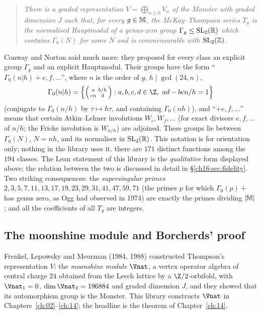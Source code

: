 \begin{quote}\itshape
There is a graded representation $V=\bigoplus_{n\ge0}V_n$ of the Monster with graded dimension $J$ such that, for
every $g\in\mathbb{M}$, the McKay--Thompson series $T_g$ is the normalised Hauptmodul of a genus-zero group
$\Gamma_g\le\mathrm{SL}_2(\mathbb{R})$ which contains $\Gamma_0(N)$ for some $N$ and is commensurable with $\mathrm{SL}_2(\mathbb{Z})$.
\end{quote}
Conway and Norton said much more: they proposed for every class an explicit group $\Gamma_g$ and an explicit
Hauptmodul.  Their groups have the form ``$\Gamma_0(n|h)+e,f,\dots$'', where $n$ is the order of $g$, $h\mid\gcd(24,n)$,
\begin{equation*}
  \Gamma_0(n|h)=\Bigl\{\chsixteenmat{a}{b/h}{cn}{d}: a,b,c,d\in\Z,\ ad-bcn/h=1\Bigr\}
\end{equation*}
(conjugate to $\Gamma_0(n/h)$ by $\tau\mapsto h\tau$, and containing $\Gamma_0(nh)$), and ``$+e,f,\dots$'' means that
certain Atkin--Lehner involutions $W_e,W_f,\dots$ (for exact divisors $e,f,\dots$ of $n/h$; the Fricke involution is
$W_{n/h}$) are adjoined.  These groups lie between $\Gamma_0(N)$, $N=nh$, and its normaliser in $\mathrm{SL}_2(\mathbb{R})$.  This
notation is for orientation only; nothing in the library uses it. there are $171$ distinct functions among the $194$
classes.  The Lean statement of this library is the \emph{qualitative} form displayed above; the relation between
the two is discussed in detail in \S\ref{ch16:sec:fidelity}.  Two striking consequences: the \emph{supersingular
primes} $2,3,5,7,11,13,17,19,23,29,31,41,47,59,71$ (the primes $p$ for which $\Gamma_0(p)+$ has genus zero, as Ogg
had observed in 1974) are exactly the primes dividing $|\mathbb{M}|$; and all the coefficients of all $T_g$ are
integers.

\subsection{The moonshine module and Borcherds' proof}

Frenkel, Lepowsky and Meurman (1984, 1988) constructed Thompson's representation $V$: the \emph{moonshine module}
$\Vnat$, a vertex operator algebra of central charge $24$ obtained from the Leech lattice by a $\Z/2$-orbifold, with
$\Vnat_1=0$, $\dim\Vnat_2=196884$ and graded dimension $J$, and they showed that its automorphism group is the
Monster.  This library constructs $\Vnat$ in Chapters~\ref{ch:02}--\ref{ch:14}; the headline is the theorem
 of Chapter~\ref{ch:14}.

